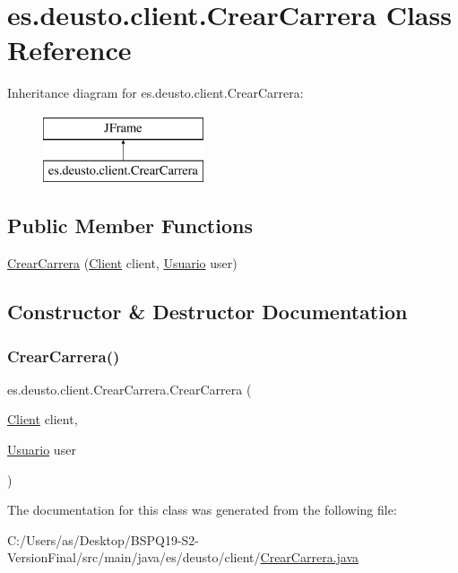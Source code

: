 \hypertarget{classes_1_1deusto_1_1client_1_1_crear_carrera}{}\section{es.\+deusto.\+client.\+Crear\+Carrera Class Reference}
\label{classes_1_1deusto_1_1client_1_1_crear_carrera}
Inheritance diagram for es.\+deusto.\+client.\+Crear\+Carrera\+:\begin{figure}[H]
\begin{center}
\leavevmode
\includegraphics[height=2.000000cm]{classes_1_1deusto_1_1client_1_1_crear_carrera}
\end{center}
\end{figure}
\subsection*{Public Member Functions}
\begin{DoxyCompactItemize}
\item 
\mbox{\hyperlink{classes_1_1deusto_1_1client_1_1_crear_carrera_ab7396c374d289ed38a61d07e6787c43b}{Crear\+Carrera}} (\mbox{\hyperlink{classes_1_1deusto_1_1client_1_1_client}{Client}} client, \mbox{\hyperlink{classes_1_1deusto_1_1server_1_1jdo_1_1_usuario}{Usuario}} user)
\end{DoxyCompactItemize}


\subsection{Constructor \& Destructor Documentation}
\mbox{\label{classes_1_1deusto_1_1client_1_1_crear_carrera_ab7396c374d289ed38a61d07e6787c43b}} 
\subsubsection{\texorpdfstring{CrearCarrera()}{CrearCarrera()}}
{\footnotesize\ttfamily es.\+deusto.\+client.\+Crear\+Carrera.\+Crear\+Carrera (\begin{DoxyParamCaption}\item[{\mbox{\hyperlink{classes_1_1deusto_1_1client_1_1_client}{Client}}}]{client,  }\item[{\mbox{\hyperlink{classes_1_1deusto_1_1server_1_1jdo_1_1_usuario}{Usuario}}}]{user }\end{DoxyParamCaption})}



The documentation for this class was generated from the following file\+:\begin{DoxyCompactItemize}
\item 
C\+:/\+Users/as/\+Desktop/\+B\+S\+P\+Q19-\/\+S2-\/\+Version\+Final/src/main/java/es/deusto/client/\mbox{\hyperlink{_crear_carrera_8java}{Crear\+Carrera.\+java}}\end{DoxyCompactItemize}
